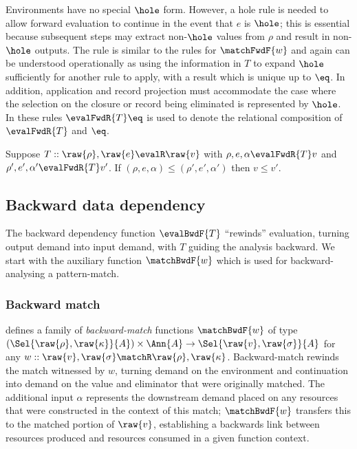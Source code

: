  Environments have no special $\hole$ form. However, a hole rule is needed to allow forward evaluation to continue in the event that $e$ is $\hole$; this is essential because subsequent steps may extract non-$\hole$ values from $\rho$ and result in non-$\hole$ outputs. The rule is similar to the rules for $\matchFwdF{w}$ and again can be understood operationally as using the information in $T$ to expand $\hole$ sufficiently for another rule to apply, with a result which is unique up to $\eq$. In addition, application and record projection must accommodate the case where the selection on the closure or record being eliminated is represented by $\hole$. In these rules $\evalFwdR{T}\eq$ is used to denote the relational composition of $\evalFwdR{T}$ and $\eq$.

\begin{lemma}
   Suppose $T :: \raw{\rho}, \raw{e} \evalR \raw{v}$ with $\rho, e, \alpha \evalFwdR{T} v$ and $\rho', e', \alpha' \evalFwdR{T} v'$. If $(\rho, e, \alpha) \leq (\rho', e', \alpha')$ then $v \leq v'$.
\end{lemma}

\subsection{Backward data dependency}
\label{sec:data-dependencies:analyses:bwd}

The backward dependency function $\evalBwdF{T}$ ``rewinds'' evaluation, turning output demand into input demand, with $T$ guiding the analysis backward. We start with the auxiliary function $\matchBwdF{w}$ which is used for backward-analysing a pattern-match.

\subsubsection{Backward match}
\label{sec:data-dependencies:analyses:bwd:pattern-match}

 defines a family of \emph{backward-match} functions $\matchBwdF{w}$ of type $(\Sel{\raw{\rho}, \raw{\kappa}}{A}) \times \Ann{A} \to \Sel{\raw{v}, \raw{\sigma}}{A}$ for any $w :: \raw{v}, \raw{\sigma} \matchR \raw{\rho}, \raw{\kappa}$. Backward-match rewinds the match witnessed by $w$, turning demand on the environment and continuation into demand on the value and eliminator that were originally matched. The additional input $\alpha$ represents the downstream demand placed on any resources that were constructed in the context of this match; $\matchBwdF{w}$ transfers this to the matched portion of $\raw{v}$, establishing a backwards link between resources produced and resources consumed in a given function context.

